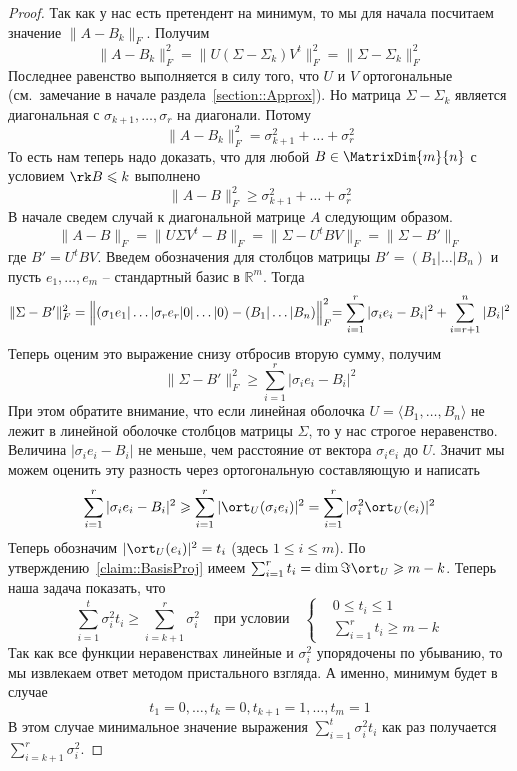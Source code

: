\begin{proof}
Так как у нас есть претендент на минимум, то мы для начала посчитаем значение $\|A-B_k\|_F$.
Получим
\[
\|A-B_k\|_F^2 = \|U(\Sigma - \Sigma_k)V^t\|_F^2 =  \|\Sigma - \Sigma_k\|_F^2
\]
Последнее равенство выполняется в силу того, что $U$ и $V$ ортогональные (см.~замечание в начале раздела~\ref{section::Approx}).
Но матрица $\Sigma-\Sigma_k$ является диагональная с $\sigma_{k+1},\ldots,\sigma_r$ на диагонали.
Потому
\[
\|A-B_k\|_F^2  = \sigma_{k+1}^2 +\ldots + \sigma_r^2
\]
То есть нам теперь надо доказать, что для любой $B\in \MatrixDim{m}{n}$ с условием $\rk B\leqslant k$ выполнено
\[
\|A - B\|_F^2\geqslant \sigma_{k+1}^2 +\ldots + \sigma_r^2
\]
В начале сведем случай к диагональной матрице $A$ следующим образом.
\[
\|A - B\|_F = \|U \Sigma V^t - B\|_F = \|\Sigma - U^t B V\|_F = \|\Sigma - B'\|_F
\]
где $B' = U^t B V$.
Введем обозначения для столбцов матрицы $B' = (B_1|\ldots|B_n)$ и пусть $e_1,\ldots,e_m$ -- стандартный базис в $\mathbb R^m$.
Тогда
\[
 \|\Sigma - B'\|^2_F = \Bigl\| (\sigma_1 e_1|\ldots|\sigma_r e_r|0 |\ldots|0) - (B_1|\ldots|B_n)\Bigl\|^2_F = \sum_{i=1}^r |\sigma_i e_i - B_i|^2 + \sum_{i=r+1}^n|B_i|^2
\]
Теперь оценим это выражение снизу отбросив вторую сумму, получим
\[
 \|\Sigma - B'\|^2_F\geqslant  \sum_{i=1}^r |\sigma_i e_i - B_i|^2
\]
При этом обратите внимание, что если линейная оболочка $U = \langle B_1,\ldots, B_n\rangle $ не лежит в линейной оболочке столбцов матрицы $\Sigma$, то у нас строгое неравенство.
Величина $|\sigma_i e_i - B_i|$ не меньше, чем расстояние от вектора $\sigma_i e_i$ до $U$.
Значит мы можем оценить эту разность через ортогональную составляющую и написать
\[
 \sum_{i=1}^r |\sigma_i e_i - B_i|^2 \geqslant \sum_{i=1}^r |\ort_U(\sigma_i e_i)|^2 =  \sum_{i=1}^r |\sigma^2_i \ort_U(e_i)|^2 
\]
Теперь обозначим $|\ort_U(e_i)|^2 = t_i$ (здесь $1\leqslant i \leqslant m$).
По утверждению~\ref{claim::BasisProj} имеем $\sum_{i=1}^r t_i = \dim \Im \ort_U \geqslant m - k$.
Теперь наша задача показать, что
\[
\sum_{i=1}^t \sigma_i^2 t_i\geqslant \sum_{i = k+1}^r\sigma_i^2\quad\text{при условии}\quad
\left\{
\begin{aligned}
&0 \leqslant t_i \leqslant 1\\
&\sum_{i=1}^r t_i \geqslant m - k
\end{aligned}
\right.
\]
Так как все функции неравенствах линейные и $\sigma_i^2$ упорядочены по убыванию, то мы извлекаем ответ методом пристального взгляда.
А именно, минимум будет в случае
\[
t_1 = 0,\ldots,t_k = 0, t_{k+1} = 1,\ldots,t_m = 1
\]
В этом случае минимальное значение выражения $\sum_{i=1}^t \sigma_i^2 t_i$ как раз получается $ \sum_{i = k+1}^r\sigma_i^2$.
\end{proof}

